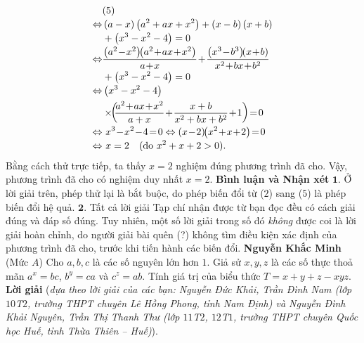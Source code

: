 \begin{multicols}{2}
\begin{align*}
		&(5) \\[-0.5ex]
		\Leftrightarrow &\left( {a - x} \right)\left( {{a^2} + ax + {x^2}} \right) + \left( {x - b} \right)\left( {x + b} \right) \\[-0.5ex]
		&+ \left( {{x^3} - {x^2} - 4} \right) = 0\\[-0.5ex]
		\Leftrightarrow &\frac{{\left( {{a^2} \!-\! {x^2}} \right)\!\!\left( {{a^2} \!+\! ax \!+\! {x^2}} \right)}}{{a \!+\! x}} \!+\! \frac{{\left( {{x^3} \!-\! {b^3}} \right)\!\!\left( {x \!+\! b} \right)}}{{{x^2} \!+\! bx \!+\! {b^2}}} \\[-0.5ex]
		&+ \left( {{x^3} - {x^2} - 4} \right) = 0\\[-0.5ex]
		\Leftrightarrow &\left( {{x^3} - {x^2} - 4} \right)\\
		&\times\!\!\left(\!\! {\frac{{{a^2} \!+\! ax \!+\! {x^2}}}{{a + x}} \!+\! \frac{{x + b}}{{{x^2} + bx + {b^2}}} \!+\! 1} \right) \!=\! 0\\[-0.5ex]
		\Leftrightarrow &\,\,{x^3} \!-\! {x^2} \!-\! 4 \!=\! 0 \Leftrightarrow  \left( {x \!-\! 2} \right)\!\!\left( {{x^2} \!+\! x \!+\! 2} \right) \!=\! 0\\[-0.5ex]
		\Leftrightarrow &\,\,x = 2 \quad(\text{\color{black}do } x^2 + x + 2 > 0).
	\end{align*}
	Bằng cách thử trực tiếp, ta thấy $x = 2$ nghiệm đúng phương trình đã cho.
	\vskip 0.05cm
	Vậy, phương trình đã cho có nghiệm duy nhất $x = 2$.
	\vskip 0.05cm
	\textbf{\color{thachthuctoanhoc}Bình luận và Nhận xét}
	\vskip 0.05cm
	$\pmb{1.}$ Ở lời giải trên, phép thử lại là bắt buộc, do phép biến đổi từ ($2$) sang ($5$) là phép biến đổi hệ quả.
	\vskip 0.05cm
	$\pmb{2.}$ Tất cả lời giải Tạp chí nhận được từ bạn đọc đều có cách giải đúng và đáp số đúng. Tuy nhiên, một số lời giải trong số đó \textit{không} được coi là lời giải hoàn chỉnh, do người giải bài quên (?) không tìm điều kiện xác định của phương trình đã cho, trước khi tiến hành các biến đổi.
	\vskip 0.05cm
	\hfill	\textbf{\color{thachthuctoanhoc}Nguyễn Khắc Minh}
	\vskip 0.05cm
	{}
	(Mức $A$) Cho $a,b,c$ là các số nguyên lớn hơn $1$. Giả sử $x,y,z$ là các số thực thoả mãn $a^x=bc$, $b^y=ca$ và $c^z=ab$. Tính giá trị của biểu thức $T=x+y+z-xyz$. 
	\vskip 0.05cm
	\textbf{\color{thachthuctoanhoc}Lời giải} (\textit{dựa theo lời giải của các bạn: Nguyễn Đức Khải, Trần Đình Nam (lớp $10$T$2$, trường THPT chuyên Lê Hồng Phong, tỉnh Nam Định) và Nguyễn Đình Khải Nguyên, Trần Thị Thanh Thư (lớp $11$T$2$, $12$T$1$, trường THPT chuyên Quốc học Huế, tỉnh Thừa Thiên -- Huế)}).

\end{multicols}
